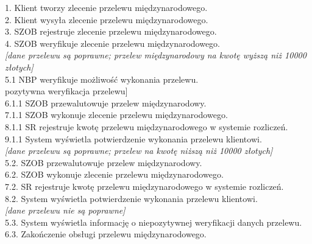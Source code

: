 \begin{flushleft}
1. Klient tworzy zlecenie przelewu międzynarodowego.\\
2. Klient wysyła zlecenie przelewu międzynarodowego.\\
3. SZOB rejestruje zlecenie przelewu międzynarodowego.\\
4. SZOB weryfikuje zlecenie przelewu międzynarodowego.\\
\textit{{[}dane przelewu są poprawne; przelew międzynarodowy na kwotę wyższą niż 10000 złotych{]}}\\
\hspace{1ex}5.1 NBP weryfikuje możliwość wykonania przelewu.\\
\hspace{1ex}{[}pozytywna weryfikacja przelewu{]}\\
\hspace{2ex}6.1.1 SZOB przewalutowuje przelew międzynarodowy.\\
\hspace{2ex}7.1.1 SZOB wykonuje zlecenie przelewu międzynarodowego.\\
\hspace{2ex}8.1.1 SR rejestruje kwotę przelewu międzynarodowego w systemie rozliczeń.\\
\hspace{2ex}9.1.1 System wyświetla potwierdzenie wykonania przelewu klientowi.\\
\hspace{2ex}\textit{{[}dane przelewu są poprawne; przelew na kwotę niższą niż 10000 złotych{]}}\\
\hspace{1ex}5.2. SZOB przewalutowuje przelew międzynarodowy.\\
\hspace{1ex}6.2. SZOB wykonuje zlecenie przelewu międzynarodowego.\\
\hspace{1ex}7.2. SR rejestruje kwotę przelewu międzynarodowego w systemie rozliczeń.\\
\hspace{1ex}8.2. System wyświetla potwierdzenie wykonania przelewu klientowi.\\
\textit{{[}dane przelewu nie są poprawne{]}}\\
\hspace{1ex}5.3. System wyświetla informację o niepozytywnej weryfikacji danych przelewu.\\
\hspace{1ex}6.3. Zakończenie obsługi przelewu międzynarodowego.\\

\end{flushleft}

